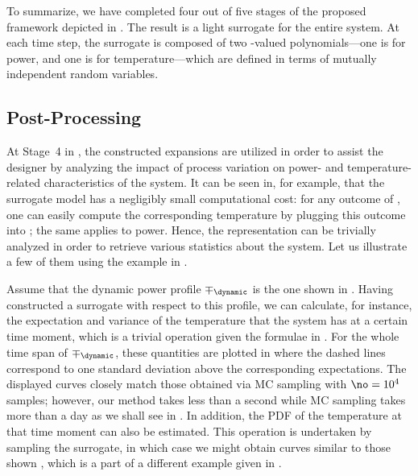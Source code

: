 To summarize, we have completed four out of five stages of the proposed
framework depicted in . The result is a light surrogate for
the entire system. At each time step, the surrogate is composed of two
\np-valued polynomials---one is for power, and one is for temperature---which
are defined in terms of \nz mutually independent random variables.

\subsection{Post-Processing}

At Stage~4 in , the constructed expansions are utilized in
order to assist the designer by analyzing the impact of process variation on
power- and temperature-related characteristics of the system. It can be seen in,
for example,  that the surrogate model has a
negligibly small computational cost: for any outcome of \vz, one can easily
compute the corresponding temperature by plugging this outcome into
; the same applies to power. Hence, the
representation can be trivially analyzed in order to retrieve various statistics
about the system. Let us illustrate a few of them using the example in
.

Assume that the dynamic power profile $\mp_\dynamic$ is the one shown in
. Having constructed a surrogate with respect to this
profile, we can calculate, for instance, the expectation and variance of the
temperature that the system has at a certain time moment, which is a trivial
operation given the formulae in . For the whole time span of
$\mp_\dynamic$, these quantities are plotted in 
where the dashed lines correspond to one standard deviation above the
corresponding expectations. The displayed curves closely match those obtained
via \ac{MC} sampling with $\no = 10^4$ samples; however, our method takes less
than a second while \ac{MC} sampling takes more than a day as we shall see in
. In addition, the \ac{PDF} of the temperature at
that time moment can also be estimated. This operation is undertaken by sampling
the surrogate, in which case we might obtain curves similar to those shown
, which is a part of a different example given in
.
